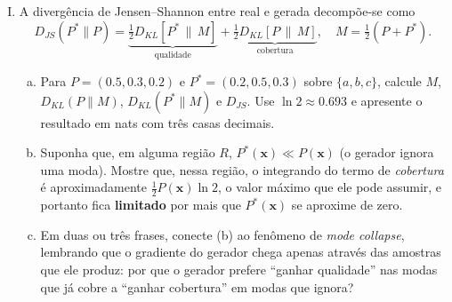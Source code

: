 \documentclass{dlproblemset}
\begin{document}
\begin{enumerate}[I)]
\item A divergência de Jensen--Shannon entre real e gerada decompõe-se como
\[
  D_{JS}(P^{*}\|P) = \underbrace{\tfrac{1}{2}D_{KL}\!\left[P^{*}\,\Big\|\,M\right]}_{\text{qualidade}}
                   + \underbrace{\tfrac{1}{2}D_{KL}\!\left[P\,\Big\|\,M\right]}_{\text{cobertura}},
                   \quad M = \tfrac{1}{2}(P + P^{*}).
\]
\begin{enumerate}[(a)]
    \item Para $P = (0.5, 0.3, 0.2)$ e $P^{*} = (0.2, 0.5, 0.3)$ sobre $\{a, b, c\}$, calcule $M$, $D_{KL}(P\|M)$, $D_{KL}(P^{*}\|M)$ e $D_{JS}$. Use $\ln 2 \approx 0.693$ e apresente o resultado em nats com três casas decimais.
    \item Suponha que, em alguma região $R$, $P^{*}(\mathbf{x}) \ll P(\mathbf{x})$ (o gerador ignora uma moda). Mostre que, nessa região, o integrando do termo de \emph{cobertura} é aproximadamente $\tfrac{1}{2}P(\mathbf{x})\ln 2$, o valor máximo que ele pode assumir, e portanto fica \textbf{limitado} por mais que $P^{*}(\mathbf{x})$ se aproxime de zero.
    \item Em duas ou três frases, conecte (b) ao fenômeno de \textit{mode collapse}, lembrando que o gradiente do gerador chega apenas através das amostras que ele produz: por que o gerador prefere ``ganhar qualidade'' nas modas que já cobre a ``ganhar cobertura'' em modas que ignora?
\end{enumerate}

\end{enumerate}
\end{document}
